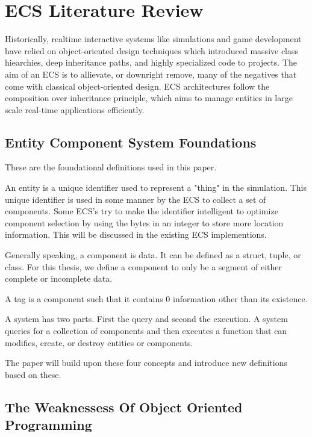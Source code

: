 \section{ECS Literature Review}

Historically, realtime interactive systems like simulations and game development have relied on object-oriented design techniques which introduced massive class hiearchies, deep inheritance paths, and highly specialized code to projects. The aim of an ECS is to allievate, or downright remove, many of the negatives that come with classical object-oriented design. ECS architectures follow the composition over inheritance principle, which aims to manage entities in large scale real-time applications efficiently. \cite{Haerkoenen2019} 

\subsection{Entity Component System Foundations}
These are the foundational definitions used in this paper.

\begin{tdefn}[Entity]
    An entity is a unique identifier used to represent a "thing" in the simulation. This unique identifier is used in some manner by the ECS to collect a set of components. Some ECS's try to make the identifier intelligent to optimize component selection by using the bytes in an integer to store more location information. This will be discussed in the existing ECS implementions.
\end{tdefn}
\begin{tdefn}[Component]
    Generally speaking, a component is data. It can be defined as a struct, tuple, or class. For this thesis, we define a component to only be a segment of either complete or incomplete data.
\end{tdefn}
\begin{tdefn}[Tag]
    A tag is a component such that it contains 0 information other than its existence.
\end{tdefn}
\begin{tdefn}[System]
    A system has two parts. First the query and second the execution. A system queries for a collection of components and then executes a function that can modifies, create, or destroy entities or components.
\end{tdefn}
\noindent The paper will build upon these four concepts and introduce new definitions based on these.

\subsection{The Weaknessess Of Object Oriented Programming}

